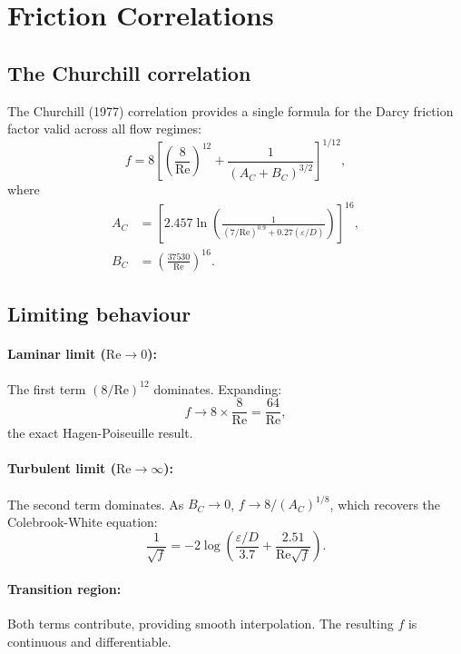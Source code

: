 \documentclass[11pt]{article}
\begin{document}
\section{Friction Correlations}
\label{app:friction}

\subsection{The Churchill correlation}

The Churchill (1977) correlation provides a single formula for the Darcy friction factor valid across all flow regimes:
\begin{equation}
  f = 8\left[\left(\frac{8}{\text{Re}}\right)^{12} + \frac{1}{(A_C + B_C)^{3/2}}\right]^{1/12},
  \label{eq:churchill-full}
\end{equation}
where
\begin{align}
  A_C &= \left[2.457\ln\left(\frac{1}{(7/\text{Re})^{0.9} + 0.27(\varepsilon/D)}\right)\right]^{16}, \\
  B_C &= \left(\frac{37530}{\text{Re}}\right)^{16}.
\end{align}

\subsection{Limiting behaviour}

\paragraph{Laminar limit ($\text{Re} \to 0$):}
The first term $(8/\text{Re})^{12}$ dominates. Expanding:
\[
  f \to 8 \times \frac{8}{\text{Re}} = \frac{64}{\text{Re}},
\]
the exact Hagen-Poiseuille result.

\paragraph{Turbulent limit ($\text{Re} \to \infty$):}
The second term dominates. As $B_C \to 0$, $f \to 8/(A_C)^{1/8}$, which recovers the Colebrook-White equation:
\[
  \frac{1}{\sqrt{f}} = -2\log\left(\frac{\varepsilon/D}{3.7} + \frac{2.51}{\text{Re}\sqrt{f}}\right).
\]

\paragraph{Transition region:}
Both terms contribute, providing smooth interpolation. The resulting $f$ is continuous and differentiable.
\end{document}
